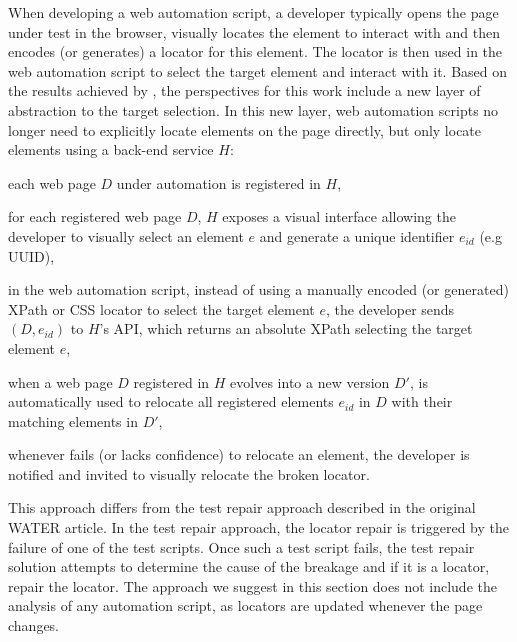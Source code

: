 \documentclass[preprint, 12pt]{elsarticle}
\begin{document}
When developing a web automation script, a developer typically opens the page under test in the browser, visually locates the element to interact with and then encodes (or generates) a locator for this element.
The locator is then used in the web automation script to select the target element and interact with it.
% 
Based on the results achieved by \erratum{}, the perspectives for this work include a new layer of abstraction to the target selection.
In this new layer, web automation scripts no longer need to explicitly locate elements on the page directly, but only locate elements using a back-end service $H$:
\begin{compactenum}
    \item each web page $D$ under automation is registered in $H$,
    \item for each registered web page $D$, $H$ exposes a visual interface
    allowing the developer to visually select an element $e$ and generate a
    unique identifier $e_{id}$ (e.g UUID),
    \item in the web automation script, instead of using a manually encoded (or generated) XPath or CSS locator to select the target element $e$, the developer sends $(D, e_{id})$ to $H$'s API, which returns an absolute XPath selecting the target element $e$,
    \item when a web page $D$ registered in $H$ evolves into a new version $D'$, \erratum{} is automatically used to relocate all registered elements $e_{id}$ in $D$ with their matching elements in $D'$,
    \item whenever \erratum{} fails (or lacks confidence) to relocate an element, the developer is notified and invited to visually relocate the broken locator.
\end{compactenum}

This approach differs from the test repair approach described in the original WATER article. 
In the test repair approach, the locator repair is triggered by the failure of one of the test scripts.
Once such a test script fails, the test repair solution attempts to determine the cause of the breakage and if it is a locator, repair the locator.
The approach we suggest in this section does not include the analysis of any automation script, as locators are updated whenever the page changes.

\end{document}
